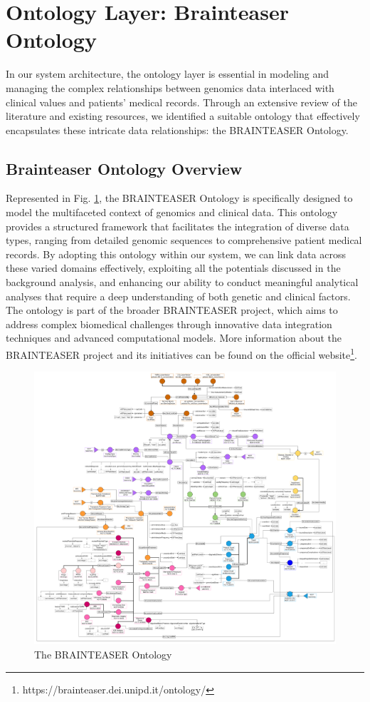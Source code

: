 \section{Ontology Layer: Brainteaser Ontology}
In our system architecture, the ontology layer is essential in modeling and managing the complex relationships between genomics data interlaced with clinical values and patients' medical records. Through an extensive review of the literature and existing resources, we identified a suitable ontology that effectively encapsulates these intricate data relationships: the \ac{BRAINTEASER} Ontology.
\subsection{Brainteaser Ontology Overview}
Represented in Fig. \ref{fig:bto}, the \ac{BRAINTEASER} Ontology is specifically designed to model the multifaceted context of genomics and clinical data. This ontology provides a structured framework that facilitates the integration of diverse data types, ranging from detailed genomic sequences to comprehensive patient medical records. By adopting this ontology within our system, we can link data across these varied domains effectively, exploiting all the potentials discussed in the background analysis, and enhancing our ability to conduct meaningful analytical analyses that require a deep understanding of both genetic and clinical factors.
The ontology is part of the broader \ac{BRAINTEASER} project, which aims to address complex biomedical challenges through innovative data integration techniques and advanced computational models. More information about the \ac{BRAINTEASER} project and its initiatives can be found on the official website\footnote{https://brainteaser.dei.unipd.it/ontology/}.
\begin{figure}[ht]
  \centering
  \includegraphics[width=15cm]{res/brainteaser.png}
  \caption{The \ac{BRAINTEASER} Ontology}
  \label{fig:bto}
\end{figure}
